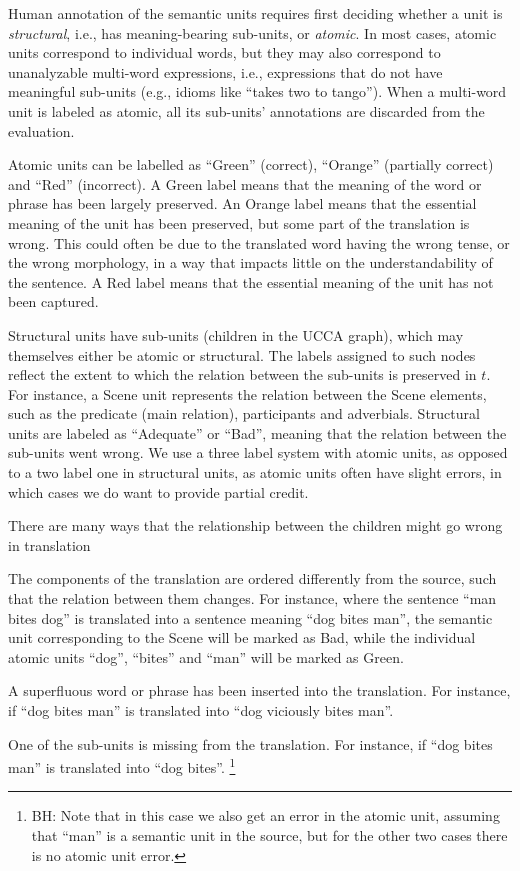 \documentclass[11pt]{article}
\newcommand{\bh}[1]{\footnote{\color{blue}BH: #1}}
\begin{document}
Human annotation of the semantic units requires first deciding whether
a unit is {\it structural}, i.e., has meaning-bearing sub-units,
or {\it atomic}. In most cases, atomic units
correspond to individual words, but they may also correspond to unanalyzable
multi-word expressions, i.e., expressions that do not have meaningful sub-units
(e.g., idioms like ``takes two to tango'').
When a multi-word unit is labeled as atomic, all its sub-units' annotations are discarded
from the evaluation.

Atomic units can be labelled as ``Green'' (correct), ``Orange'' (partially correct)
and ``Red'' (incorrect). 
A Green label means that the meaning of the word or phrase has been largely preserved.
An Orange label means that the essential meaning of the unit has been preserved,
but some part of the translation is wrong.
This could often be due to the translated word having the wrong tense,
or the wrong morphology, in a way that impacts little on the understandability of the sentence.
A Red label means that the essential meaning of the unit has not been captured.

Structural units have sub-units (children in the UCCA graph), which may themselves
either be atomic or structural. The labels assigned to such nodes reflect the extent to which
the relation between the sub-units is preserved in $t$.
For instance, a Scene unit represents the relation between the
Scene elements, such as the predicate (main relation), participants and adverbials.
Structural units are labeled as ``Adequate'' or ``Bad'', meaning
that the relation between the sub-units went wrong.
We use a three label system with atomic units, as
opposed to a two label one in structural units,
as atomic units often have slight errors, in which cases we do want to provide partial credit.

There are many ways that the relationship between the children might go
wrong in translation

\begin{compactitem}
\item The components of the translation are ordered differently from the source,
  such that the relation between them changes. For instance, where
  the sentence ``man bites dog'' is translated into a sentence meaning ``dog bites man'',
  the semantic unit corresponding to the Scene will be marked as Bad, while
  the individual atomic units ``dog'', ``bites'' and ``man'' will be marked as Green.
\item A superfluous word or phrase has been inserted into
  the translation. For instance, if ``dog bites man'' is translated into ``dog viciously bites man''.
\item One of the sub-units is missing from the translation.
  For instance, if ``dog bites man'' is translated into ``dog bites''. \bh{Note that in this case we also 
  get an error in the atomic unit, assuming that ``man'' is a semantic unit in the source, but for the other
  two cases there is no atomic unit error.}
\end{compactitem}
\end{document}
